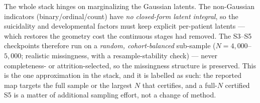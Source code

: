 \begin{caveatbox}
The whole stack hinges on marginalizing the Gaussian latents. The non-Gaussian indicators
(binary/ordinal/count) have \emph{no closed-form latent integral}, so the suicidality and developmental factors
must keep explicit per-patient latents --- which restores the geometry cost the continuous stages had removed.
The S3--S5 checkpoints therefore run on a \emph{random, cohort-balanced} sub-sample ($N=4{,}000$--$5{,}000$;
realistic missingness, with a resample-stability check) --- never completeness- or attrition-selected, so the
missingness structure is preserved. This is the one approximation in the stack, and it is labelled as such: the
reported map targets the full sample or the largest $N$ that certifies, and a full-$N$ certified S5 is a matter
of additional sampling effort, not a change of method.
\end{caveatbox}
